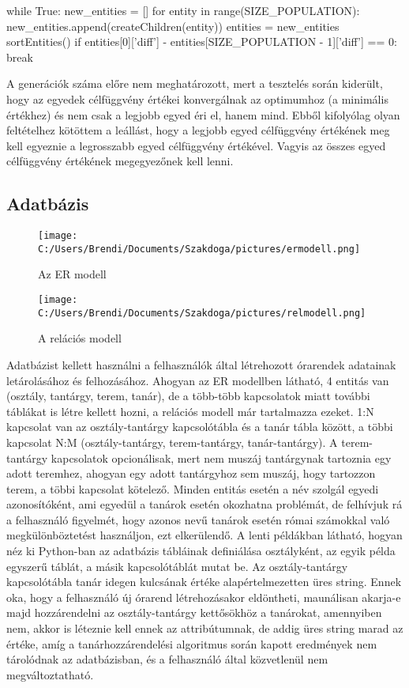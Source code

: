 \documentclass[a4paper,12pt]{article}
\begin{document}
\begin{python}
while True:
    new_entities = []
    for entity in range(SIZE_POPULATION):
        new_entities.append(createChildren(entity))
    entities = new_entities
    sortEntities()
    if entities[0]['diff'] - entities[SIZE_POPULATION - 1]['diff'] == 0:
        break
\end{python}

A generációk száma előre nem meghatározott, mert a tesztelés során kiderült, hogy az egyedek célfüggvény értékei konvergálnak az optimumhoz (a minimális értékhez) és nem csak a legjobb egyed éri el, hanem mind. Ebből kifolyólag olyan feltételhez kötöttem a leállást, hogy a legjobb egyed célfüggvény értékének meg kell egyeznie a legrosszabb egyed célfüggvény értékével. Vagyis az összes egyed célfüggvény értékének megegyezőnek kell lenni.

\subsection{Adatbázis}

\begin{figure}
\texttt{[image: C:/Users/Brendi/Documents/Szakdoga/pictures/ermodell.png]}
\caption{Az ER modell}
\end{figure}

\begin{figure}
\texttt{[image: C:/Users/Brendi/Documents/Szakdoga/pictures/relmodell.png]}
\caption{A relációs modell}
\end{figure}

Adatbázist kellett használni a felhasználók által létrehozott órarendek adatainak letárolásához és felhozásához. Ahogyan az ER modellben látható, 4 entitás van (osztály, tantárgy, terem, tanár), de a több-több kapcsolatok miatt további táblákat is létre kellett hozni, a relációs modell már tartalmazza ezeket. 1:N kapcsolat van az osztály-tantárgy kapcsolótábla és a tanár tábla között, a többi kapcsolat N:M (osztály-tantárgy, terem-tantárgy, tanár-tantárgy). A terem-tantárgy kapcsolatok opcionálisak, mert nem muszáj tantárgynak tartoznia egy adott teremhez, ahogyan egy adott tantárgyhoz sem muszáj, hogy tartozzon terem, a többi kapcsolat kötelező. Minden entitás esetén a név szolgál egyedi azonosítóként, ami egyedül a tanárok esetén okozhatna problémát, de felhívjuk rá a felhasználó figyelmét, hogy azonos nevű tanárok esetén római számokkal való megkülönböztetést használjon, ezt elkerülendő. A lenti példákban látható, hogyan néz ki Python-ban az adatbázis tábláinak definiálása osztályként, az egyik példa egyszerű táblát, a másik kapcsolótáblát mutat be. Az osztály-tantárgy kapcsolótábla tanár idegen kulcsának értéke alapértelmezetten üres string. Ennek oka, hogy a felhasználó új órarend létrehozásakor eldöntheti, maunálisan akarja-e majd hozzárendelni az osztály-tantárgy kettősökhöz a tanárokat, amennyiben nem, akkor is léteznie kell ennek az attribútumnak, de addig üres string marad az értéke, amíg a tanárhozzárendelési algoritmus során kapott eredmények nem tárolódnak az adatbázisban, és a felhasználó által közvetlenül nem megváltoztatható.
\end{document}

